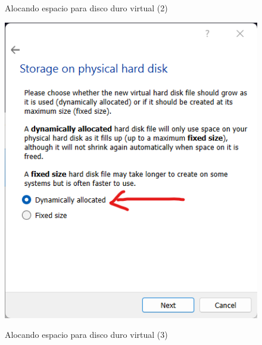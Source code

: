 \documentclass[stu, 12pt, letterpaper, donotrepeattitle, floatsintext, natbib, helv]{apa7}
\begin{document}
\begin{enumerate}
\begin{figure}[H]
        \caption{Alocando espacio para disco duro virtual (2)}
        \label{fig:VHDD2}
    \end{figure}
    \begin{figure}[H]
        \includegraphics[width = 1\textwidth]{VirtualHardDiskCreation3.png} \\
        \caption{Alocando espacio para disco duro virtual (3)}
        \label{fig:VHDD3}
    \end{figure}
    \begin{figure}[H]

\end{figure}
\end{enumerate}
\end{document}
